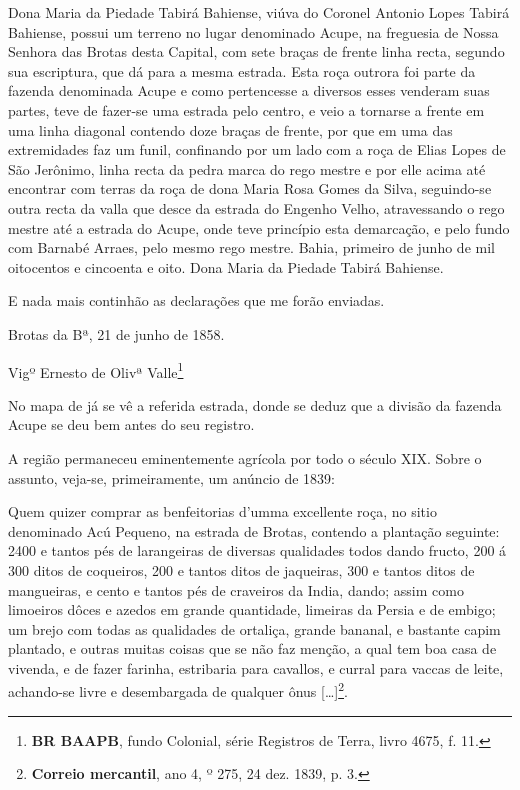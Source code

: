 \begin{citacao}
Dona Maria da Piedade Tabirá Bahiense, viúva do Coronel Antonio Lopes Tabirá Bahiense, possui um terreno no lugar denominado Acupe, na freguesia de Nossa Senhora das Brotas desta Capital, com sete braças de frente linha recta, segundo sua escriptura, que dá para a mesma estrada. Esta roça outrora foi parte da fazenda denominada Acupe e como pertencesse a diversos esses venderam suas partes, teve de fazer-se uma estrada pelo centro, e veio a tornarse a frente em uma linha diagonal contendo doze braças de frente, por que em uma das extremidades faz um funil, confinando por um lado com a roça de Elias Lopes de São Jerônimo, linha recta da pedra marca do rego mestre e por elle acima até encontrar com terras da roça de dona Maria Rosa Gomes da Silva, seguindo-se outra recta da valla que desce da estrada do Engenho Velho, atravessando o rego mestre até a estrada do Acupe, onde teve princípio esta demarcação, e pelo fundo com Barnabé Arraes, pelo mesmo rego mestre. Bahia, primeiro de junho de mil oitocentos e cincoenta e oito. Dona Maria da Piedade Tabirá Bahiense.

E nada mais continhão as declarações que me forão enviadas.

Brotas da Bª, 21 de junho de 1858.

Vigº Ernesto de Olivª Valle\footnote{\textbf{BR BAAPB}, fundo Colonial, série Registros de Terra, livro 4675, f. 11.}
\end{citacao}

No mapa de  já se vê a referida estrada, donde se deduz que a divisão da fazenda Acupe se deu bem antes do seu registro. 

A região permaneceu eminentemente agrícola por todo o século XIX. Sobre o assunto, veja-se, primeiramente, um anúncio de 1839:

\begin{citacao}
Quem quizer comprar as benfeitorias d'umma excellente roça, no sitio denominado Acú Pequeno, na estrada de Brotas, contendo a plantação seguinte: 2400 e tantos pés de larangeiras de diversas qualidades todos dando fructo, 200 á 300 ditos de coqueiros, 200 e tantos ditos de jaqueiras, 300 e tantos ditos de mangueiras, e cento e tantos pés de craveiros da India, dando; assim como limoeiros dôces e azedos em grande quantidade, limeiras da Persia e de embigo; um brejo com todas as qualidades de ortaliça, grande bananal, e bastante capim plantado, e outras muitas coisas que se não faz menção, a qual tem boa casa de vivenda, e de fazer farinha, estribaria para cavallos, e curral para vaccas de leite, achando-se livre e desembargada de qualquer ônus [\dots]\footnote{\textbf{Correio mercantil}, ano 4, º 275, 24 dez. 1839, p. 3.}.
\end{citacao}

